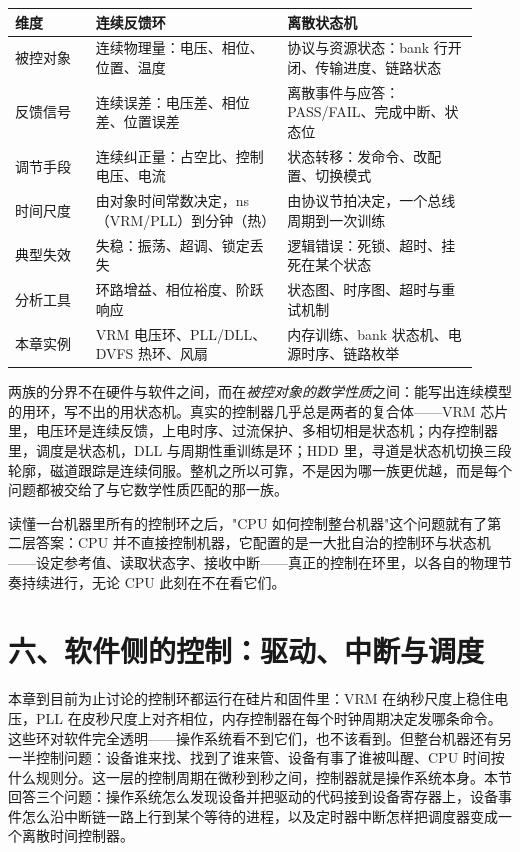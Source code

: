 \begin{longtable}{L{0.16\linewidth}L{0.38\linewidth}L{0.38\linewidth}}
\toprule
维度 & 连续反馈环 & 离散状态机 \\
\midrule
被控对象 & 连续物理量：电压、相位、位置、温度 & 协议与资源状态：bank 行开闭、传输进度、链路状态 \\
反馈信号 & 连续误差：电压差、相位差、位置误差 & 离散事件与应答：PASS/FAIL、完成中断、状态位 \\
调节手段 & 连续纠正量：占空比、控制电压、电流 & 状态转移：发命令、改配置、切换模式 \\
时间尺度 & 由对象时间常数决定，ns（VRM/PLL）到分钟（热） & 由协议节拍决定，一个总线周期到一次训练 \\
典型失效 & 失稳：振荡、超调、锁定丢失 & 逻辑错误：死锁、超时、挂死在某个状态 \\
分析工具 & 环路增益、相位裕度、阶跃响应 & 状态图、时序图、超时与重试机制 \\
本章实例 & VRM 电压环、PLL/DLL、DVFS 热环、风扇 & 内存训练、bank 状态机、电源时序、链路枚举 \\
\bottomrule
\end{longtable}

两族的分界不在硬件与软件之间，而在\emph{被控对象的数学性质}之间：能写出连续模型的用环，写不出的用状态机。真实的控制器几乎总是两者的复合体——VRM 芯片里，电压环是连续反馈，上电时序、过流保护、多相切相是状态机；内存控制器里，调度是状态机，DLL 与周期性重训练是环；HDD 里，寻道是状态机切换三段轮廓，磁道跟踪是连续伺服。整机之所以可靠，不是因为哪一族更优越，而是每个问题都被交给了与它数学性质匹配的那一族。

读懂一台机器里所有的控制环之后，"CPU 如何控制整台机器"这个问题就有了第二层答案：CPU 并不直接控制机器，它配置的是一大批自治的控制环与状态机——设定参考值、读取状态字、接收中断——真正的控制在环里，以各自的物理节奏持续进行，无论 CPU 此刻在不在看它们。
\section{六、软件侧的控制：驱动、中断与调度}

本章到目前为止讨论的控制环都运行在硅片和固件里：VRM 在纳秒尺度上稳住电压，PLL 在皮秒尺度上对齐相位，内存控制器在每个时钟周期决定发哪条命令。这些环对软件完全透明——操作系统看不到它们，也不该看到。但整台机器还有另一半控制问题：设备谁来找、找到了谁来管、设备有事了谁被叫醒、CPU 时间按什么规则分。这一层的控制周期在微秒到秒之间，控制器就是操作系统本身。本节回答三个问题：操作系统怎么发现设备并把驱动的代码接到设备寄存器上，设备事件怎么沿中断链一路上行到某个等待的进程，以及定时器中断怎样把调度器变成一个离散时间控制器。

